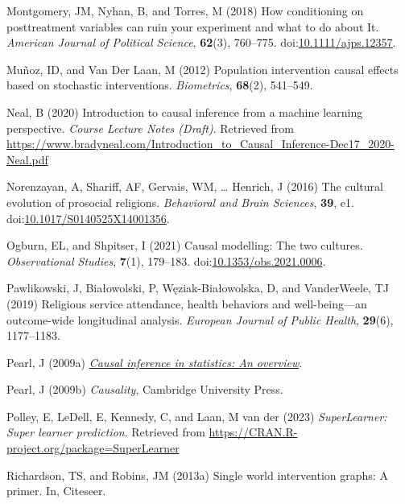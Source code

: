\documentclass[
  single column]{article}
\newlength{\cslhangindent}
\newenvironment{CSLReferences}[2] %
 {\begin{list}{}{%
  \setlength{\itemindent}{0pt}
  \setlength{\leftmargin}{0pt}
  \setlength{\parsep}{0pt}
  \ifodd #1
   \setlength{\leftmargin}{\cslhangindent}
   \setlength{\itemindent}{-1\cslhangindent}
  \fi
  \setlength{\itemsep}{#2\baselineskip}}}
 {\end{list}}
\begin{document}
\begin{CSLReferences}{1}{0}
Montgomery, JM, Nyhan, B, and Torres, M (2018) How conditioning on
posttreatment variables can ruin your experiment and what to do about
It. \emph{American Journal of Political Science}, \textbf{62}(3),
760--775.
doi:\href{https://doi.org/10.1111/ajps.12357}{10.1111/ajps.12357}.

Muñoz, ID, and Van Der Laan, M (2012) Population intervention causal
effects based on stochastic interventions. \emph{Biometrics},
\textbf{68}(2), 541--549.

Neal, B (2020) Introduction to causal inference from a machine learning
perspective. \emph{Course Lecture Notes (Draft)}. Retrieved from
\url{https://www.bradyneal.com/Introduction_to_Causal_Inference-Dec17_2020-Neal.pdf}

Norenzayan, A, Shariff, AF, Gervais, WM, \ldots{} Henrich, J (2016) The
cultural evolution of prosocial religions. \emph{Behavioral and Brain
Sciences}, \textbf{39}, e1.
doi:\href{https://doi.org/10.1017/S0140525X14001356}{10.1017/S0140525X14001356}.

Ogburn, EL, and Shpitser, I (2021) Causal modelling: The two cultures.
\emph{Observational Studies}, \textbf{7}(1), 179--183.
doi:\href{https://doi.org/10.1353/obs.2021.0006}{10.1353/obs.2021.0006}.

Pawlikowski, J, Białowolski, P, Węziak-Białowolska, D, and VanderWeele,
TJ (2019) Religious service attendance, health behaviors and
well-being---an outcome-wide longitudinal analysis. \emph{European
Journal of Public Health}, \textbf{29}(6), 1177--1183.

Pearl, J (2009a) \emph{\href{https://doi.org/10.1214/09-SS057}{Causal
inference in statistics: An overview}}.

Pearl, J (2009b) \emph{Causality}, Cambridge University Press.

Polley, E, LeDell, E, Kennedy, C, and Laan, M van der (2023)
\emph{SuperLearner: Super learner prediction}. Retrieved from
\url{https://CRAN.R-project.org/package=SuperLearner}

Richardson, TS, and Robins, JM (2013a) Single world intervention graphs:
A primer. In, Citeseer.


\end{CSLReferences}
\end{document}
